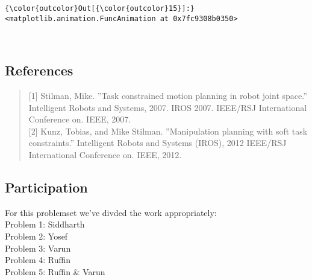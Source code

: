 \documentclass{article}
\begin{document}
            \begin{Verbatim}[commandchars=\\\{\}]
{\color{outcolor}Out[{\color{outcolor}15}]:} <matplotlib.animation.FuncAnimation at 0x7fc9308b0350>
\end{Verbatim}
        
    \begin{center}
    \end{center}
    { \hspace*{\fill} \\}
    

    \subsection{References}


    \begin{quote}
{[}1{]} Stilman, Mike. ''Task constrained motion planning in robot joint
space.'' Intelligent Robots and Systems, 2007. IROS 2007. IEEE/RSJ
International Conference on. IEEE, 2007.\\{[}2{]} Kunz, Tobias, and Mike
Stilman. ''Manipulation planning with soft task constraints.''
Intelligent Robots and Systems (IROS), 2012 IEEE/RSJ International
Conference on. IEEE, 2012.
\end{quote}


    \subsection{Participation}


    For this problemset we've divded the work appropriately:\\Problem 1:
Siddharth\\Problem 2: Yosef\\Problem 3: Varun\\Problem 4:
Ruffin\\Problem 5: Ruffin \& Varun


    
    
    
    
\end{document}
